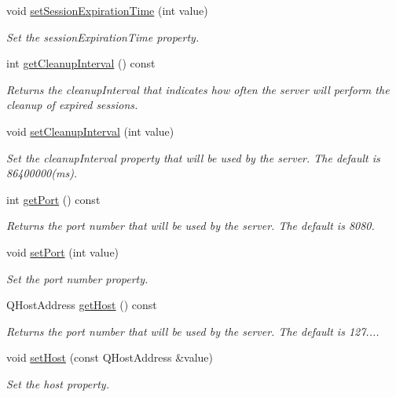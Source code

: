 \begin{DoxyCompactItemize}
void \hyperlink{class_configuration_a306d88e7d7c2b8394844936b49be9013}{set\+Session\+Expiration\+Time} (int value)
\begin{DoxyCompactList}\small\item\em Set the session\+Expiration\+Time property. \end{DoxyCompactList}\item 
int \hyperlink{class_configuration_a6a592b2194d4059f31aaf4223ee2e70e}{get\+Cleanup\+Interval} () const
\begin{DoxyCompactList}\small\item\em Returns the cleanup\+Interval that indicates how often the server will perform the cleanup of expired sessions. \end{DoxyCompactList}\item 
void \hyperlink{class_configuration_a5d6a822ffd2c3c029ae1864f8358a592}{set\+Cleanup\+Interval} (int value)
\begin{DoxyCompactList}\small\item\em Set the cleanup\+Interval property that will be used by the server. The default is 86400000(ms). \end{DoxyCompactList}\item 
int \hyperlink{class_configuration_ab34eb25aa1e175c7ac8323300b298a8a}{get\+Port} () const
\begin{DoxyCompactList}\small\item\em Returns the port number that will be used by the server. The default is 8080. \end{DoxyCompactList}\item 
void \hyperlink{class_configuration_aae5aafdfeb2a6e110ef8bad90a85be5e}{set\+Port} (int value)
\begin{DoxyCompactList}\small\item\em Set the port number property. \end{DoxyCompactList}\item 
Q\+Host\+Address \hyperlink{class_configuration_a37ca7476a8ab5a1e6c4b5a3e07670d9f}{get\+Host} () const
\begin{DoxyCompactList}\small\item\em Returns the port number that will be used by the server. The default is 127.... \end{DoxyCompactList}\item 
void \hyperlink{class_configuration_a0851c4f93476b80acebd88204c4a86c6}{set\+Host} (const Q\+Host\+Address \&value)
\begin{DoxyCompactList}\small\item\em Set the host property. \end{DoxyCompactList}\item 

\end{DoxyCompactItemize}
